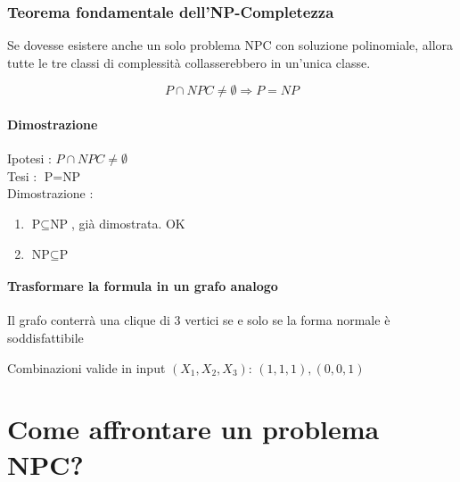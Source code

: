 
\subsubsection{Teorema fondamentale dell'NP-Completezza}

Se dovesse esistere anche un solo problema NPC con soluzione polinomiale, allora tutte le tre classi di complessità collasserebbero in un'unica classe.

\begin{equation}
P \cap NPC \neq \emptyset \Rightarrow P = NP
\end{equation}

\paragraph{Dimostrazione}

Ipotesi : $P \cap NPC \neq \emptyset$ \\
Tesi : $\text{P} = \text{NP}$ \\

Dimostrazione : 

\begin{enumerate}
\item $\text{P} \subseteq \text{NP}$, già dimostrata. OK
\item $\text{NP} \subseteq \text{P}$
\end{enumerate}





\paragraph{Trasformare la formula in un grafo analogo}

\begin{figure}
 \centering 

\end{figure}

Il grafo conterrà una clique di 3 vertici se e solo se la forma normale è soddisfattibile

Combinazioni valide in input $(X_1,X_2,X_3)$: $(1,1,1), (0,0,1)$


\section{Come affrontare un problema NPC?}

